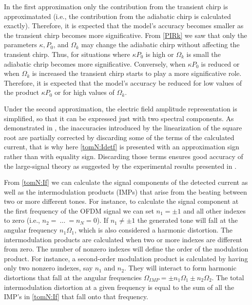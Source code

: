 \documentclass[journal]{IEEEtran}
\begin{document}
In the first approximation only the contribution from the transient chirp is approximatated (i.e., the contribution from the adiabatic chirp is calculated exactly). Therefore, it is expected that the model's accuracy becomes smaller as the transient chirp becomes more significative. From \eqref{PIRk} we saw that only the parameters $\kappa, P_0$, and $\Omega_k$ may change the adiabatic chirp without affecting the transient chirp. Thus, for situations where $\kappa P_0$ is high or $\Omega_k$ is small the adiabatic chrip becomes more significative. Conversely, when $\kappa P_0$ is reduced or when $\Omega_k$ is increased the transient chirp starts to play a more significative role. Therefore, it is expected that the model's accuracy be reduced for low values of the product $\kappa P_0$ or for high values of $\Omega_k$. 

Under the second approximation, the electric field amplitude representation is simplified, so that it can be expressed just with two spectral components. As demonstrated in \cite{comments}, the inaccuracies introduced by the linearization of the square root are partially corrected by discarding some of the terms of the calculated current, that is why here \eqref{tomN:Idetf} is presented with an approximation sign rather than with equality sign. Discarding those terms ensures good accuracy of the large-signal theory as suggested by the experimental results presented in \cite{eva}. 

From \eqref{tomN:If} we can calculate the signal components of the detected current as well as the intermodulation products (IMPs) that arise from the beating between two or more different tones. For instance, to calculate the signal component at the first frequency of the OFDM signal we can set $n_1 = \pm 1$ and all other indexes to zero (i.e., $n_2=~\ldots~=n_N = 0$). If $n_1 \neq \pm1$ the generated tone will fall at the angular frequency $n_1\Omega_1$, which is also considered a harmonic distortion. The intermodulation products are calculated when two or more indexes are different from zero. The number of nonzero indexes will define the order of the modulation product. For instance, a second-order modulation product is calculated by having only two nonzero indexes, say $n_1$ and $n_2$. They will interact to form harmonic distortions that fall at the angular frequencies $\Omega_{IMP} = \pm n_1\Omega_1 \pm n_2\Omega_2$. The total intermodulation distortion at a given frequency is equal to the sum of all the IMP’s in \eqref{tomN:If} that fall onto that frequency.
\end{document}
